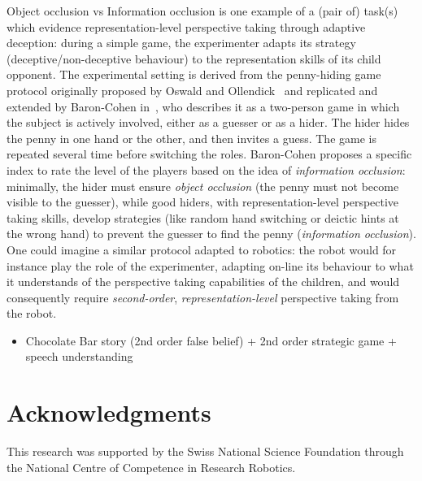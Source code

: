 \documentclass{sig-alternate}
\begin{document}
Object occlusion vs Information occlusion is one example of a (pair of) task(s)
which evidence representation-level perspective taking through adaptive
deception: during a simple game, the experimenter adapts its strategy
(deceptive/non-deceptive behaviour) to the representation skills of its child
opponent. The experimental setting is derived from the penny-hiding game
protocol originally proposed by Oswald and Ollendick~\cite{oswald1989role} and
replicated and extended by Baron-Cohen in~\cite{baron1992out}, who describes it
as a two-person game in which the subject is actively involved, either as a
guesser or as a hider. The hider hides the penny in one hand or the other, and
then invites a guess. The game is repeated several time before switching the
roles. Baron-Cohen proposes a specific index to rate the level of the players
based on the idea of \emph{information occlusion}: minimally, the hider must
ensure \emph{object occlusion} (the penny must not become visible to the
guesser), while good hiders, with representation-level perspective taking
skills, develop strategies (like random hand switching or deictic hints at the
wrong hand) to prevent the guesser to find the penny (\emph{information
occlusion}). One could imagine a similar protocol adapted to robotics:
the robot would for instance play the role of the experimenter, adapting
on-line its behaviour to what it understands of the perspective taking
capabilities of the children, and would consequently require
\emph{second-order}, \emph{representation-level} perspective taking from the
robot.

\begin{itemize}
    \item Chocolate Bar story (2nd order false belief) + 2nd order strategic
        game + speech understanding~\cite{flobbe2008children}
\end{itemize}

\section*{Acknowledgments}

This research was supported by the Swiss National Science Foundation through the
National Centre of Competence in Research Robotics.






\end{document}
